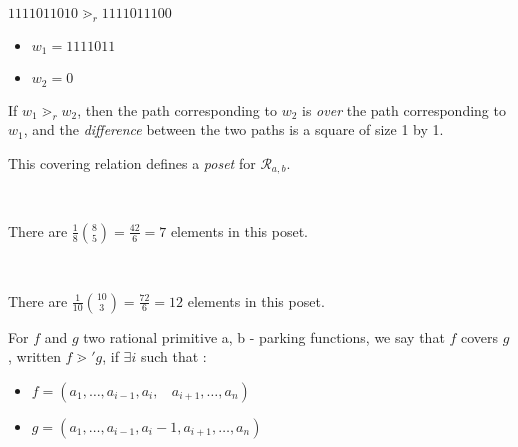 \begin{example}[$a = 7, b = 3$]
    $1111011010 \gtrdot_r 1111011100$
    \begin{itemize}
        \item $w_1 = 1111011$
        \item $w_2 = 0$
    \end{itemize}
    
\end{example}

\begin{rem}
    If $w_1 \gtrdot_r w_2$, then the path corresponding to
    $w_2$ is \emph{over} the path corresponding to $w_1$,
    and the \emph{difference} between the two paths is a
    square of size 1 by 1.
\end{rem}

\begin{prop}
    This covering relation defines a \emph{poset}
    for $\mathcal{R}_{a,b}$.
\end{prop}

\begin{example}
    ~\\
    \begin{center}
        
        There are $\frac {1}{8} \binom{8}{5} = \frac{42}{6} = 7$
        elements in this poset.
    \end{center}
\end{example}

\begin{example}
    ~\\
    \begin{center}
        
        There are $\frac {1}{10} \binom{10}{3} = \frac{72}{6} = 12$
        elements in this poset.
    \end{center}
\end{example}

\begin{definition}[$\gtrdot'$]
    For $f$ and $g$ two rational primitive a, b - parking 
    functions, we say that $f$ covers $g$, written
    $f \gtrdot' g$, if $\exists i$ such that :
    \begin{itemize}
        \item $f = (a_1, \ldots, a_{i-1}, a_i,\ \ \ \ 
            a_{i+1}, \ldots, a_n)$
        \item $g = (a_1, \ldots, a_{i-1}, a_i - 1, a_{i+1},
        \ldots, a_n)$
    \end{itemize}
\end{definition}


